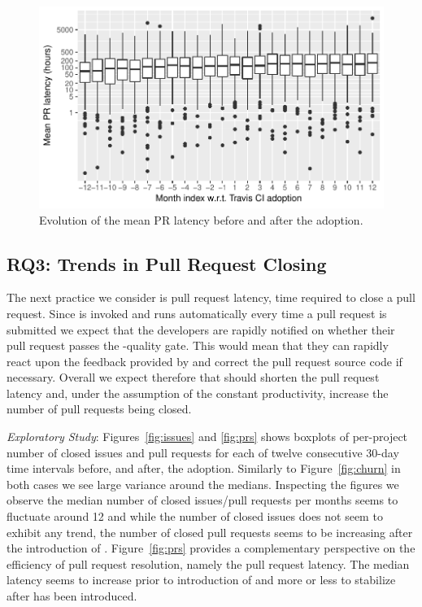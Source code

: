\begin{figure}[t]
\centering
\includegraphics[width=\columnwidth, clip=true, trim=0 0 0 0]{figures/pr-latency-mean.pdf}
\caption{Evolution of the mean PR latency before and after the \Tvis adoption.}
\label{fig:pr-latency}
\end{figure}





\subsection{RQ3: Trends in Pull Request Closing}
The next practice we consider is pull request latency, \ie time required to close a pull request. 
Since \Tvis is invoked and runs automatically every time a pull request is submitted we expect that the developers are rapidly notified on whether their pull request passes the \Tvi-quality gate.
This would mean that they can rapidly react upon the feedback provided by \Tvi and correct the pull request source code if necessary.
Overall we expect therefore that \Tvis should shorten the pull request latency and, under the assumption of the constant productivity, increase the number of 
pull requests being closed.

\smallskip\noindent \emph{Exploratory Study}:
Figures~\ref{fig:issues} and \ref{fig:prs}  shows boxplots of per-project number of closed issues and pull requests for each of twelve consecutive 30-day time 
intervals before, and after, the \Tvis adoption. 
Similarly to Figure~\ref{fig:churn} in both cases we see large variance around the medians. 
Inspecting the figures we observe the median number of closed issues/pull requests per months seems to fluctuate around 12 
and while the number of closed issues does not seem to exhibit any trend, the number of closed pull requests seems to be increasing after the introduction of \Tvis.
Figure~\ref{fig:prs} provides a complementary perspective on the efficiency of pull request resolution, namely the pull request latency.
The median latency seems to increase prior to introduction of \Tvis and more or less to stabilize after \Tvis has been introduced.

